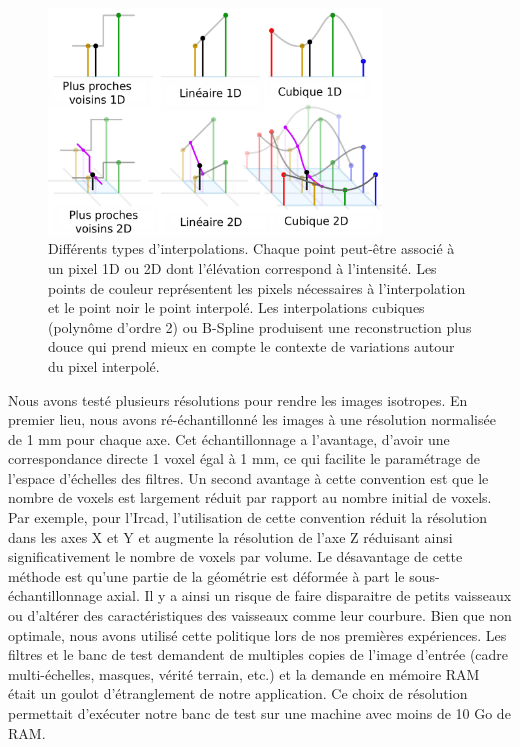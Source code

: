 \begin{figure}[!ht]
  \centering
  \includegraphics[height=6cm]{Images/Interpolation.png}
  \caption{Différents types d'interpolations. Chaque point peut-être associé à un pixel 1D ou 2D dont l'élévation correspond à l'intensité. Les points de couleur représentent les pixels nécessaires à l'interpolation et le point noir le point interpolé. Les interpolations cubiques (polynôme d'ordre 2) ou B-Spline produisent une reconstruction plus douce qui prend mieux en compte le contexte de variations autour du pixel interpolé.\protect \footnotemark}
  \label{fig:interpolation}
\end{figure}
Nous avons testé plusieurs résolutions pour rendre les images isotropes. En premier lieu, nous avons ré-échantillonné les images à une résolution normalisée de 1 mm pour chaque axe. Cet échantillonnage a l'avantage, d'avoir une correspondance directe 1 voxel égal à 1 mm, ce qui facilite le paramétrage de l'espace d'échelles des filtres. Un second avantage à cette convention est que le nombre de voxels est largement réduit par rapport au nombre initial de voxels.
Par exemple, pour l'Ircad, l'utilisation de cette convention  réduit la résolution dans les axes X et Y et augmente la résolution de l'axe Z réduisant ainsi significativement le nombre de voxels par volume. Le désavantage de cette méthode est qu'une partie de la géométrie est déformée à part le sous-échantillonnage axial. Il y a ainsi un risque de faire disparaitre de petits vaisseaux ou d'altérer des caractéristiques des vaisseaux comme leur courbure.  Bien que non optimale, nous avons utilisé cette politique lors de nos premières expériences. Les filtres et le banc de test demandent de multiples copies de l'image d'entrée (cadre multi-échelles, masques, vérité terrain, etc.) et la demande en mémoire RAM était un goulot d'étranglement de notre application. Ce choix de résolution permettait d'exécuter notre banc de test sur une machine avec moins de 10 Go de RAM.

